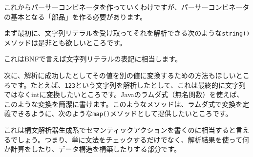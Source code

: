 これからパーサーコンビネータを作っていくわけですが、パーサーコンビネータの基本となる「部品」を作る必要があります。

まず最初に、文字列リテラルを受け取ってそれを解析できる次のような\texttt{string()}メソッドは是非とも欲しいところです。

\begin{Shaded}
\begin{Highlighting}[]
 \NormalTok{\textless{}}\NormalTok{\textgreater{}(}\NormalTok{, }\NormalTok{(}\NormalTok{(}\NormalTok{(}\NormalTok{));}
\end{Highlighting}
\end{Shaded}

これはBNFで言えば文字列リテラルの表記に相当します。

次に、解析に成功したとしてその値を別の値に変換するための方法もほしいところです。たとえば、\texttt{123}という文字列を解析したとして、これは最終的に文字列ではなくintに変換したいところです。Javaのラムダ式（無名関数）を使えば、このような変換を簡潔に書けます。このようなメソッドは、ラムダ式で変換を定義できるように、次のような\texttt{map()}メソッドとして提供したいところです。

\begin{Shaded}
\begin{Highlighting}[]
\NormalTok{ (} \NormalTok{\textless{}}\NormalTok{\textgreater{}(}\NormalTok{, }\NormalTok{(}
    \NormalTok{(}\NormalTok{(}\NormalTok{(}\NormalTok{)}
\NormalTok{);}
\end{Highlighting}
\end{Shaded}

これは構文解析器生成系でセマンティックアクションを書くのに相当すると言えるでしょう。つまり、単に文法をチェックするだけでなく、解析結果を使って何か計算をしたり、データ構造を構築したりする部分です。

